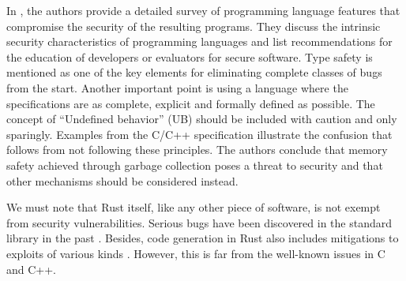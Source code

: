In \cite{jaeger2014mind}, the authors provide a detailed survey of programming language features that
compromise the security of the resulting programs.
They discuss the intrinsic security characteristics of programming languages and list recommendations
for the education of developers or evaluators for secure software.
Type safety is mentioned as one of the key elements for eliminating complete classes of bugs from the start.
Another important point is using a language where the specifications are
as complete, explicit and formally defined as possible.
The concept of ``Undefined behavior'' (UB) should be included with caution and only sparingly.
Examples from the C/C++ specification illustrate the confusion that follows from not following these principles.
The authors conclude that memory safety achieved through garbage collection poses a threat to security
and that other mechanisms should be considered instead.

We must note that Rust itself, like any other piece of software, is not exempt from security vulnerabilities.
Serious bugs have been discovered in the standard library in the past \cite{davidoff2018}.
Besides, code generation in Rust also includes mitigations to exploits of various kinds \cite[Chap. 11]{rustc-book}.
However, this is far from the well-known issues in C and C++.